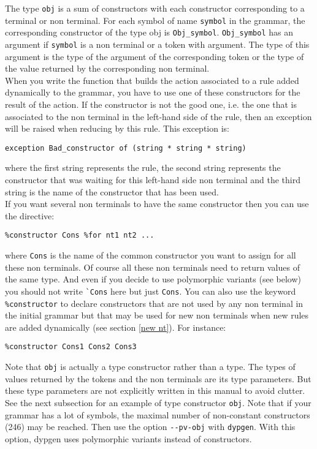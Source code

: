 \documentclass[12pt]{article}
\begin{document}
{The type \texttt{obj} is a sum of constructors with each constructor corresponding to a terminal or non terminal. For each symbol of name \texttt{symbol} in the grammar, the corresponding constructor of the type obj is \texttt{Obj\_symbol}. \texttt{Obj\_symbol} has an argument if \texttt{symbol} is a non terminal or a token with argument. The type of this argument is the type of the argument of the corresponding token or the type of the value returned by the corresponding non terminal.\\

When you write the function that builds the action associated to a rule added dynamically to the grammar, you have to use one of these constructors for the result of the action. If the constructor is not the good one, i.e. the one that is associated to the non terminal in the left-hand side of the rule, then an exception will be raised when reducing by this rule. This exception is:
\begin{verbatim}
exception Bad_constructor of (string * string * string)
\end{verbatim}
where the first string represents the rule, the second string represents the constructor that was waiting for this left-hand side non terminal and the third string is the name of the constructor that has been used.\\

If you want several non terminals to have the same constructor then you can use the directive:
\begin{verbatim}
%constructor Cons %for nt1 nt2 ...
\end{verbatim}
where \verb|Cons| is the name of the  common constructor you want to assign for all these non terminals. Of course all these non terminals need to return values of the same type. And even if you decide to use polymorphic variants (see below) you should not write \verb|`Cons| here but just \verb|Cons|. You can also use the keyword \verb|%constructor| to declare constructors that are not used by any non terminal in the initial grammar but that may be used for new non terminals when new rules are added dynamically (see section \ref{new nt}). For instance:
\begin{verbatim}
%constructor Cons1 Cons2 Cons3
\end{verbatim}

Note that \texttt{obj} is actually a type constructor rather than a type. The types of values returned by the tokens and the non terminals are its type parameters. But these type parameters are not explicitly written in this manual to avoid clutter. See the next subsection for an example of type constructor \verb|obj|. Note that if your grammar has a lot of symbols, the maximal number of non-constant constructors (246) may be reached. Then use the option \verb|--pv-obj| with \verb|dypgen|. With this option, dypgen uses polymorphic variants instead of constructors.\\

}
\end{document}
